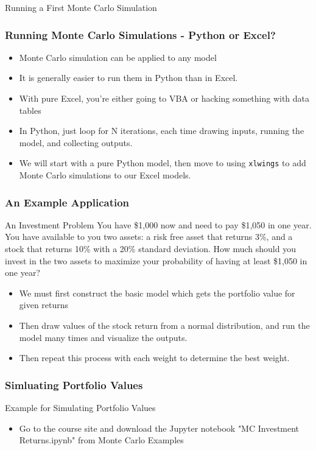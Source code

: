 \documentclass[handout, 11pt]{beamer}
\begin{document}
\begin{section}[Run MC]{Running a First Monte Carlo Simulation}
\begin{frame}
\frametitle{Running Monte Carlo Simulations - Python or Excel?}
\begin{itemize}
\item Monte Carlo simulation can be applied to any model
\vfill
\item It is generally easier to run them in Python than in Excel.
\vfill
\item With pure Excel, you're either going to VBA or hacking something with data tables
\vfill
\item In Python, just loop for N iterations, each time drawing inputs, running the model, and collecting outputs.
\vfill
\item We will start with a pure Python model, then move to using
\texttt{xlwings}
to add Monte Carlo simulations to our Excel models.
\end{itemize}
\end{frame}
\begin{frame}
\frametitle{An Example Application}
\begin{block}{An Investment Problem}
You have \$1,000 now and need to pay \$1,050 in one year. You have available to you two assets: a risk free asset that returns 3\%, and a stock that returns 10\% with a 20\% standard deviation. How much should you invest in the two assets to maximize your probability of having at least \$1,050 in one year?
\end{block}
\vfill
\begin{itemize}
\item We must first construct the basic model which gets the portfolio value for given returns
\item Then draw values of the stock return from a normal distribution, and run the model many times and visualize the outputs. 
\item Then repeat this process with each weight to determine the best weight.
\end{itemize}
\end{frame}
\begin{frame}
\frametitle{Simluating Portfolio Values}
{
\begin{block}{Example for Simulating Portfolio Values}
\begin{itemize}
\item Go to the course site and download the Jupyter notebook "MC Investment Returns.ipynb" from Monte Carlo Examples

\end{itemize}
\end{block}}
\end{frame}
\end{section}
\end{document}

